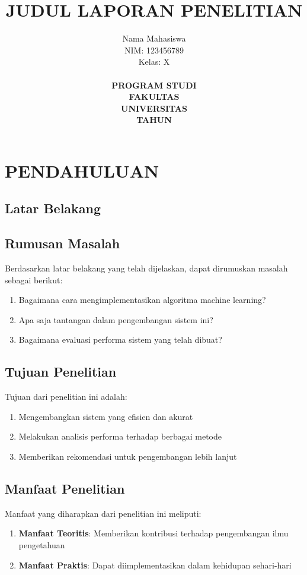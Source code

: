 \documentclass[11pt,a4paper]{article}
\title{\textbf{JUDUL LAPORAN PENELITIAN}}
\author{
    Nama Mahasiswa\\
    NIM: 123456789\\
    Kelas: X\\
    \\
    \textbf{PROGRAM STUDI}\\
    \textbf{FAKULTAS}\\
    \textbf{UNIVERSITAS}\\
    \textbf{TAHUN}
}
\date{}
\begin{document}
\maketitle
\thispagestyle{empty}

\newpage

\tableofcontents
\thispagestyle{empty}

\newpage
\setcounter{page}{1}

\section{PENDAHULUAN}

\subsection{Latar Belakang}
\lipsum[1-2]

\subsection{Rumusan Masalah}
Berdasarkan latar belakang yang telah dijelaskan, dapat dirumuskan masalah sebagai berikut:
\begin{enumerate}
    \item Bagaimana cara mengimplementasikan algoritma machine learning?
    \item Apa saja tantangan dalam pengembangan sistem ini?
    \item Bagaimana evaluasi performa sistem yang telah dibuat?
\end{enumerate}

\subsection{Tujuan Penelitian}
Tujuan dari penelitian ini adalah:
\begin{enumerate}
    \item Mengembangkan sistem yang efisien dan akurat
    \item Melakukan analisis performa terhadap berbagai metode
    \item Memberikan rekomendasi untuk pengembangan lebih lanjut
\end{enumerate}

\subsection{Manfaat Penelitian}
Manfaat yang diharapkan dari penelitian ini meliputi:
\begin{enumerate}
    \item \textbf{Manfaat Teoritis}: Memberikan kontribusi terhadap pengembangan ilmu pengetahuan
    \item \textbf{Manfaat Praktis}: Dapat diimplementasikan dalam kehidupan sehari-hari
\end{enumerate}
\end{document}
